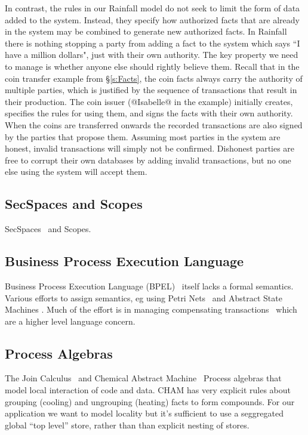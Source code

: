 In contrast, the rules in our Rainfall model do not seek to limit the form of data added to the system. Instead, they specify how authorized facts that are already in the system may be combined to generate new authorized facts. In Rainfall there is nothing stopping a party from adding a fact to the system which says ``I have a million dollars", just with their own authority. The key property we need to manage is whether anyone else should rightly believe them. Recall that in the coin transfer example from \S\ref{s:Facts}, the coin facts always carry the authority of multiple parties, which is justified by the sequence of transactions that result in their production. The coin issuer (@Isabelle@ in the example) initially creates, specifies the rules for using them, and signs the facts with their own authority. When the coins are transferred onwards the recorded transactions are also signed by the parties that propose them. Assuming most parties in the system are honest, invalid transactions will simply not be confirmed. Dishonest parties are free to corrupt their own databases by adding invalid transactions, but no one else using the system will accept them.

\subsection{SecSpaces and Scopes}
SecSpaces~\cite{Busi2003:SecSpaces} and Scopes.






\subsection{Business Process Execution Language}
Business Process Execution Language (BPEL)~\cite{Andrews2003:BPEL} itself lacks a formal semantics. Various efforts to assign semantics, eg using Petri Nets~\cite{Lohmann2009:PetriBPEL} and Abstract State Machines \cite{Fahland2005:SemanticsBPEL}. Much of the effort is in managing compensating transactions~\cite{Colombo2011:Compensating} which are a higher level language concern.


\subsection{Process Algebras}
The Join Calculus~\cite{Cedric1996:Reflexive} and Chemical Abstract Machine~\cite{Berry1992:Chemical} Process algebras that model local interaction of code and data. CHAM has very explicit rules about grouping (cooling) and ungrouping (heating) facts to form compounds. For our application we want to model locality but it's sufficient to use a seggregated global ``top level'' store, rather than than explicit nesting of stores.


